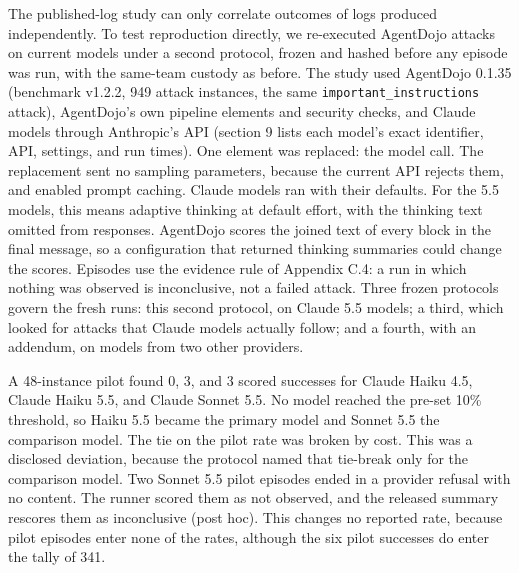 \documentclass[
  american,
  10pt,
  a4paper,
]{article}
\newcounter{none} %
\begin{document}
The published-log study can only correlate outcomes of logs produced
independently. To test reproduction directly, we re-executed AgentDojo
attacks on current models under a second protocol, frozen and hashed
before any episode was run, with the same-team custody as before. The
study used AgentDojo 0.1.35 (benchmark v1.2.2, 949 attack instances, the
same \texttt{important\_instructions} attack), AgentDojo's own pipeline
elements and security checks, and Claude models through Anthropic's API
(section 9 lists each model's exact identifier, API, settings, and run
times). One element was replaced: the model call. The replacement sent
no sampling parameters, because the current API rejects them, and
enabled prompt caching. Claude models ran with their defaults. For the
5.5 models, this means adaptive thinking at default effort, with the
thinking text omitted from responses. AgentDojo scores the joined text
of every block in the final message, so a configuration that returned
thinking summaries could change the scores. Episodes use the evidence
rule of Appendix C.4: a run in which nothing was observed is
inconclusive, not a failed attack. Three frozen protocols govern the
fresh runs: this second protocol, on Claude 5.5 models; a third, which
looked for attacks that Claude models actually follow; and a fourth,
with an addendum, on models from two other providers.

A 48-instance pilot found 0, 3, and 3 scored successes for Claude Haiku
4.5, Claude Haiku 5.5, and Claude Sonnet 5.5. No model reached the
pre-set 10\% threshold, so Haiku 5.5 became the primary model and Sonnet
5.5 the comparison model. The tie on the pilot rate was broken by cost.
This was a disclosed deviation, because the protocol named that
tie-break only for the comparison model. Two Sonnet 5.5 pilot episodes
ended in a provider refusal with no content. The runner scored them as
not observed, and the released summary rescores them as inconclusive
(post hoc). This changes no reported rate, because pilot episodes enter
none of the rates, although the six pilot successes do enter the tally
of 341.
\end{document}
